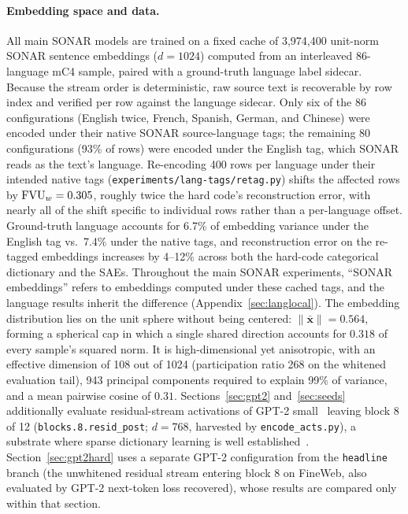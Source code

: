 \paragraph{Embedding space and data.}
All main SONAR models are trained on a fixed cache of 3{,}974{,}400
unit-norm SONAR sentence embeddings ($d{=}1024$) computed from an
interleaved 86-language mC4 sample, paired with a ground-truth language
label sidecar. Because the stream order is deterministic, raw source text
is recoverable by row index and verified per row against the language
sidecar. Only six of the 86 configurations (English twice, French, Spanish,
German, and Chinese) were encoded under their native SONAR source-language
tags; the remaining 80 configurations (93\% of rows) were encoded under the
English tag, which SONAR reads as the text's language.
Re-encoding 400 rows per language under their intended native tags
(\texttt{experiments/\allowbreak lang-tags/\allowbreak retag.py}) shifts the
affected rows by $\mathrm{FVU}_w = 0.305$, roughly twice the hard code's
reconstruction error, with nearly all of the shift specific to individual
rows rather than a per-language offset. Ground-truth language accounts for
6.7\% of embedding variance under the English tag vs.\ 7.4\% under the
native tags, and reconstruction error on the re-tagged embeddings increases
by 4--12\% across both the hard-code categorical dictionary and the SAEs.
Throughout the main SONAR experiments, ``SONAR embeddings'' refers to
embeddings computed under these cached tags, and the language results
inherit the difference (Appendix~\ref{sec:langlocal}). The embedding
distribution lies on the unit sphere without being centered:
$\lVert\bar{\mathbf{x}}\rVert = 0.564$, forming a spherical cap in which a
single shared direction accounts for $0.318$ of every sample's squared
norm. It is high-dimensional yet anisotropic, with an effective dimension
of 108 out of 1024 (participation ratio 268 on the whitened evaluation
tail), 943 principal components required to explain 99\% of variance, and a
mean pairwise cosine of $0.31$. Sections~\ref{sec:gpt2}
and~\ref{sec:seeds} additionally evaluate residual-stream activations of
GPT-2 small~\cite{radford2019} leaving block 8 of 12
(\texttt{blocks.8.resid\_post}; $d{=}768$, harvested by
\texttt{encode\_acts.py}), a substrate where sparse dictionary learning is
well established~\cite{gao2024}. Section~\ref{sec:gpt2hard} uses a separate
GPT-2 configuration from the \texttt{headline} branch (the unwhitened
residual stream entering block 8 on FineWeb, also evaluated by GPT-2
next-token loss recovered), whose results are compared only within that
section.

